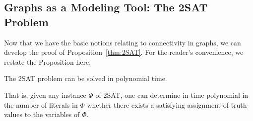 \subsection{Graphs as a Modeling Tool: The {\sf 2SAT} Problem}
\label{sec:graph-model-2SAT}

Now that we have the basic notions relating to connectivity in graphs, we can develop the proof of Proposition~\ref{thm:2SAT}.  For the reader's convenience, we restate the Proposition here.

\begin{prop}
\label{thm:2SAT-reprise}
The {\sf 2SAT} problem can be solved in polynomial time.

\smallskip

\noindent
That is, given any instance $\Phi$ of {\sf 2SAT}, one can determine in time polynomial in the number of literals in $\Phi$ whether there exists a satisfying assignment of truth-values to the variables of $\Phi$.
\end{prop}

